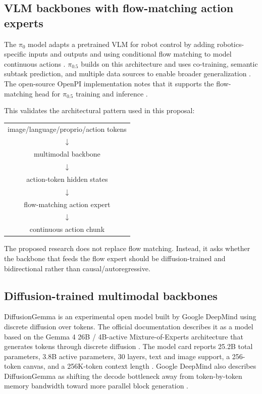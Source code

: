 \documentclass[11pt]{article}
\begin{document}
\subsection{VLM backbones with flow-matching action experts}

The $\pi_0$ model adapts a pretrained VLM for robot control by adding robotics-specific inputs and outputs and using conditional flow matching to model continuous actions \cite{pi0}. $\pi_{0.5}$ builds on this architecture and uses co-training, semantic subtask prediction, and multiple data sources to enable broader generalization \cite{pi05}. The open-source OpenPI implementation notes that it supports the flow-matching head for $\pi_{0.5}$ training and inference \cite{openpi}.

This validates the architectural pattern used in this proposal:

\begin{center}
\begin{tabular}{c}
image/language/proprio/action tokens \\
$\downarrow$ \\
multimodal backbone \\
$\downarrow$ \\
action-token hidden states \\
$\downarrow$ \\
flow-matching action expert \\
$\downarrow$ \\
continuous action chunk
\end{tabular}
\end{center}

The proposed research does not replace flow matching. Instead, it asks whether the backbone that feeds the flow expert should be diffusion-trained and bidirectional rather than causal/autoregressive.

\subsection{Diffusion-trained multimodal backbones}

DiffusionGemma is an experimental open model built by Google DeepMind using discrete diffusion over tokens. The official documentation describes it as a model based on the Gemma 4 26B / 4B-active Mixture-of-Experts architecture that generates tokens through discrete diffusion \cite{diffusiongemma_docs}. The model card reports 25.2B total parameters, 3.8B active parameters, 30 layers, text and image support, a 256-token canvas, and a 256K-token context length \cite{diffusiongemma_card}. Google DeepMind also describes DiffusionGemma as shifting the decode bottleneck away from token-by-token memory bandwidth toward more parallel block generation \cite{diffusiongemma_deepmind}.
\end{document}
